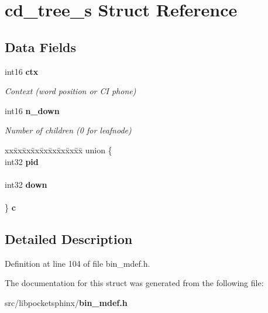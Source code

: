 \section{cd\+\_\+tree\+\_\+s Struct Reference}
\label{structcd__tree__s}
\subsection*{Data Fields}
\begin{DoxyCompactItemize}
\item 
int16 {\bf ctx}\label{structcd__tree__s_a2168538bf6cc21ad1a2c99fa2deb4559}

\begin{DoxyCompactList}\small\item\em Context (word position or C\+I phone) \end{DoxyCompactList}\item 
int16 {\bf n\+\_\+down}\label{structcd__tree__s_ae5e735d325b0f278ff2ad55293faa616}

\begin{DoxyCompactList}\small\item\em Number of children (0 for leafnode) \end{DoxyCompactList}\item 
\begin{tabbing}
xx\=xx\=xx\=xx\=xx\=xx\=xx\=xx\=xx\=\kill
union \{\\
\>int32 {\bf pid}\\
\>\\
\>int32 {\bf down}\\
\>\\
\} {\bfseries c}\label{structcd__tree__s_acc49ddc3248fc58d5a9bf241fffcbc2b}
\\

\end{tabbing}\end{DoxyCompactItemize}


\subsection{Detailed Description}


Definition at line 104 of file bin\+\_\+mdef.\+h.



The documentation for this struct was generated from the following file\+:\begin{DoxyCompactItemize}
\item 
src/libpocketsphinx/{\bf bin\+\_\+mdef.\+h}\end{DoxyCompactItemize}
